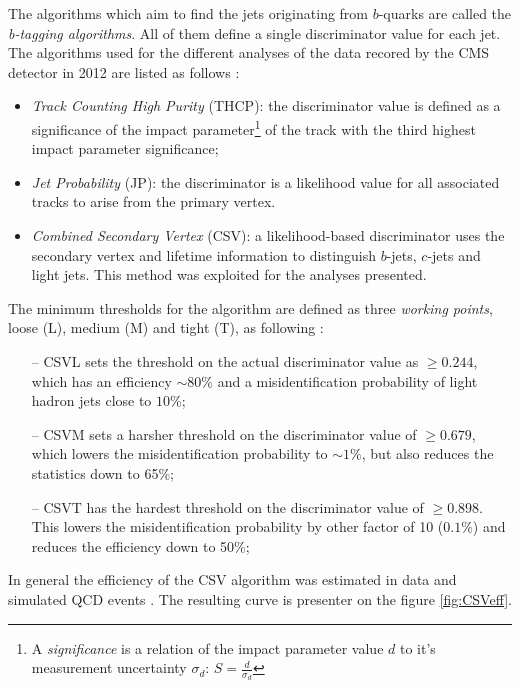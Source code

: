 The algorithms which aim to find the jets originating from $b$-quarks are called the \textit{b-tagging algorithms}. All of them define a single discriminator value for each jet.
The algorithms used for the different analyses of the data recored by the CMS detector in 2012 are listed as follows \cite{CMS-PAS-BTV-13-001}: 

\begin{itemize}
 \item \textit{Track Counting High Purity} (THCP): the discriminator value is defined as a significance of the impact parameter\footnote{A \textit{significance} is a relation 
 of the impact parameter value $d$ to it's measurement uncertainty $\sigma_{d}$: $S = \frac{d}{\sigma_{d}}$} of the track with the third highest
 impact parameter significance;
 \item \textit{Jet Probability} (JP): the discriminator is a likelihood value for all associated tracks to arise from the primary vertex. 
 \item \textit{Combined Secondary Vertex} (CSV): a likelihood-based discriminator uses the secondary vertex and lifetime information to distinguish $b$-jets, $c$-jets
 and light jets. This method was exploited for the analyses presented.
\end{itemize}

The minimum thresholds for the algorithm are defined as three \textit{working points}, loose (L), medium (M) and tight (T), as following \cite{CMS-PAS-BTV-13-001}:

\begin{itemize}
 \item [--] CSVL sets the threshold on the actual discriminator value as $\geq 0.244$, which has an efficiency $\sim 80\%$ and a misidentification probability of
 light hadron jets close to $10\%$;
 \item [--] CSVM sets a harsher threshold on the discriminator value of $\geq 0.679$, which lowers the misidentification probability to $\sim 1\%$, but also
 reduces the statistics down to 65$\%$;
 \item [--] CSVT has the hardest threshold on the discriminator value of $\geq 0.898$. This lowers the misidentification probability by other factor of 10 ($0.1\%$)
 and reduces the efficiency down to 50$\%$;
\end{itemize}

In general the efficiency of the CSV algorithm was estimated in data and simulated QCD events \cite{CMS-PAS-BTV-13-001}. The resulting curve is presenter on the figure \ref{fig:CSVeff}.

